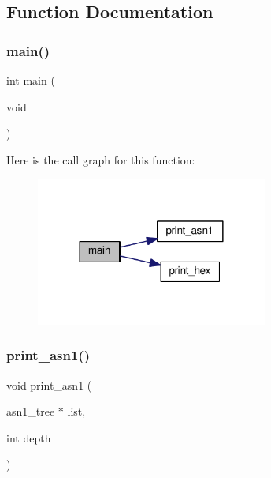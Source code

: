 \subsection{Function Documentation}
\mbox{\label{pkg__tiny-asn1_2main_8c_a840291bc02cba5474a4cb46a9b9566fe}} 
\subsubsection{\texorpdfstring{main()}{main()}}
{\footnotesize\ttfamily int main (\begin{DoxyParamCaption}\item[{void}]{ }\end{DoxyParamCaption})}

Here is the call graph for this function\+:
\nopagebreak
\begin{figure}[H]
\begin{center}
\leavevmode
\includegraphics[width=216pt]{pkg__tiny-asn1_2main_8c_a840291bc02cba5474a4cb46a9b9566fe_cgraph}
\end{center}
\end{figure}
\mbox{\label{pkg__tiny-asn1_2main_8c_ae4f7d0f99310a055172c96821890edbe}} 
\subsubsection{\texorpdfstring{print\+\_\+asn1()}{print\_asn1()}}
{\footnotesize\ttfamily void print\+\_\+asn1 (\begin{DoxyParamCaption}\item[{asn1\+\_\+tree $\ast$}]{list,  }\item[{int}]{depth }\end{DoxyParamCaption})}

